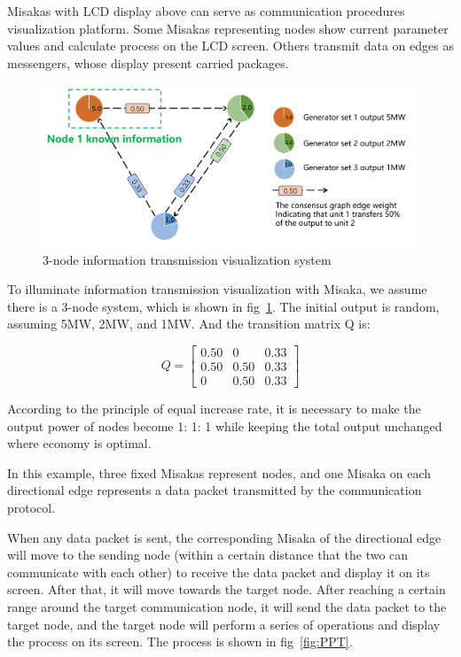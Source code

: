 \documentclass[conference]{IEEEtran}
\begin{document}
Misakas with LCD display above can serve as communication procedures visualization platform. Some Misakas representing nodes show current parameter values and calculate process on the LCD screen. Others transmit data on edges as messengers, whose display present carried packages.

\begin{figure}[htbp]
    \centering
    \includegraphics[width=\columnwidth]{PPT0.png}
    \caption{3-node information transmission visualization system}
    \label{fig:PPT0}
\end{figure}

To illuminate information transmission visualization with Misaka, we assume there is a 3-node system, which is shown in fig~\ref{fig:PPT0}. The initial output is random, assuming 5MW, 2MW, and 1MW. And the transition matrix Q is:

\begin{equation}
    Q=\left[\begin{array}{ccc}
    0.50 & 0 & 0.33 \\
    0.50 & 0.50 & 0.33 \\
    0 & 0.50 & 0.33
    \end{array}\right]
\end{equation}

According to the principle of equal increase rate, it is necessary to make the output power of nodes become 1: 1: 1 while keeping the total output unchanged where economy is optimal.

In this example, three fixed Misakas represent nodes, and one Misaka on each directional edge represents a data packet transmitted by the communication protocol.

When any data packet is sent, the corresponding Misaka of the directional edge will move to the sending node (within a certain distance that the two can communicate with each other) to receive the data packet and display it on its screen. After that, it will move towards the target node. After reaching a certain range around the target communication node, it will send the data packet to the target node, and the target node will perform a series of operations and display the process on its screen. The process is shown in fig~\ref{fig:PPT}.
\end{document}
